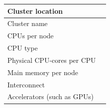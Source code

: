 \documentclass[ext,showhints]{nhrproposal}
\begin{document}
\BenchmarkSystem
\begin{center}
\begin{tabular}{|G{5cm}|L{10cm}|}\hline
Cluster location &  \\ \hline
Cluster name & \\ \hline
CPUs per node & \\ \hline
CPU type & \\ \hline
Physical CPU-cores per CPU & \\ \hline
Main memory per node & \\ \hline
Interconnect & \\ \hline
Accelerators (such as GPUs) & \\ \hline
\end{tabular}
\end{center}

\BenchmarkData

\BenchmarkDiscussion





\ResourceJustification
\end{document}
